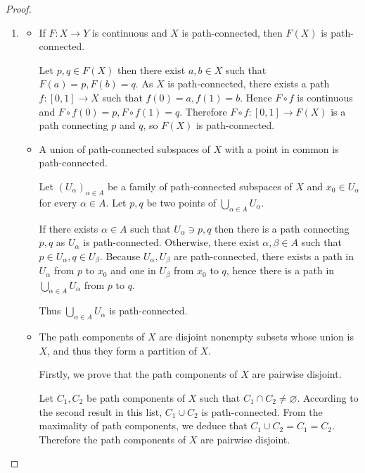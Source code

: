 \begin{proof}
    \begin{enumerate}[itemsep=0pt,label={(\alph*)}]
        \item \begin{itemize}
                  \item If \( F: X \to Y \) is continuous and \( X \) is path-connected, then \( F(X) \) is path-connected.

                        Let \( p, q \in F(X) \) then there exist \( a, b \in X \) such that \( F(a) = p, F(b) = q \). As \( X \) is path-connected, there exists a path \( f: [0, 1] \to X \) such that \( f(0) = a, f(1) = b \). Hence \( F \circ f \) is continuous and \( F \circ f(0) = p, F \circ f(1) = q \). Therefore \( F \circ f: [0, 1] \to F(X) \) is a path connecting \( p \) and \( q \), so \( F(X) \) is path-connected.
                  \item A union of path-connected subspaces of \( X \) with a point in common is path-connected.

                        Let \( {(U_{\alpha})}_{\alpha \in A} \) be a family of path-connected subspaces of \( X \) and \( x_{0} \in U_{\alpha} \) for every \( \alpha \in A \). Let \( p, q \) be two points of \( \bigcup_{\alpha \in A} U_{\alpha} \).

                        If there exists \( \alpha \in A \) such that \( U_{\alpha} \ni p, q \) then there is a path connecting \( p, q \) as \( U_{\alpha} \) is path-connected. Otherwise, there exist \( \alpha, \beta \in A \) such that \( p \in U_{\alpha}, q \in U_{\beta} \). Because \( U_{\alpha}, U_{\beta} \) are path-connected, there exists a path in \( U_{\alpha} \) from \( p \) to \( x_{0} \) and one in \( U_{\beta} \) from \( x_{0} \) to \( q \), hence there is a path in \( \bigcup_{\alpha \in A} U_{\alpha} \) from \( p \) to \( q \).

                        Thus \( \bigcup_{\alpha \in A} U_{\alpha} \) is path-connected.
                  \item The path components of \( X \) are disjoint nonempty subsets whose union is \( X \), and thus they form a partition of \( X \).

                        Firstly, we prove that the path components of \( X \) are pairwise disjoint.

                        Let \( C_{1}, C_{2} \) be path components of \( X \) such that \( C_{1} \cap C_{2} \ne \varnothing \). According to the second result in this list, \( C_{1} \cup C_{2} \) is path-connected. From the maximality of path components, we deduce that \( C_{1} \cup C_{2} = C_{1} = C_{2} \). Therefore the path components of \( X \) are pairwise disjoint.


\end{itemize}
\end{enumerate}
\end{proof}
